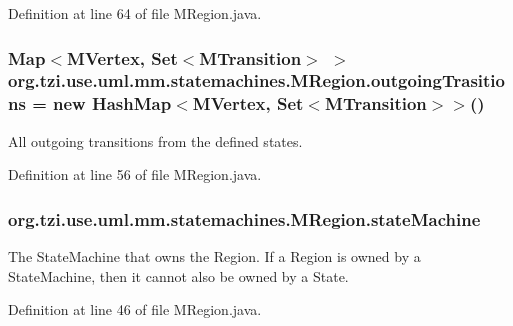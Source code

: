 Definition at line 64 of file M\-Region.\-java.

\hypertarget{classorg_1_1tzi_1_1use_1_1uml_1_1mm_1_1statemachines_1_1_m_region_aab3d4cbd873535285ab6cc0161cba8a5}{
\subsubsection[{outgoing\-Trasitions}]{\setlength{\rightskip}{0pt plus 5cm}Map$<${\bf M\-Vertex}, Set$<${\bf M\-Transition}$>$ $>$ org.\-tzi.\-use.\-uml.\-mm.\-statemachines.\-M\-Region.\-outgoing\-Trasitions = new Hash\-Map$<${\bf M\-Vertex}, Set$<${\bf M\-Transition}$>$$>$()\hspace{0.3cm}{\ttfamily [protected]}}}\label{classorg_1_1tzi_1_1use_1_1uml_1_1mm_1_1statemachines_1_1_m_region_aab3d4cbd873535285ab6cc0161cba8a5}
All outgoing transitions from the defined states. 

Definition at line 56 of file M\-Region.\-java.

\hypertarget{classorg_1_1tzi_1_1use_1_1uml_1_1mm_1_1statemachines_1_1_m_region_a97b6df0d73e6b6daa4c1684058a125c1}{
\subsubsection[{state\-Machine}]{ org.\-tzi.\-use.\-uml.\-mm.\-statemachines.\-M\-Region.\-state\-Machine\hspace{0.3cm}{\ttfamily [protected]}}}\label{classorg_1_1tzi_1_1use_1_1uml_1_1mm_1_1statemachines_1_1_m_region_a97b6df0d73e6b6daa4c1684058a125c1}
The State\-Machine that owns the Region. If a Region is owned by a State\-Machine, then it cannot also be owned by a State. 

Definition at line 46 of file M\-Region.\-java.

